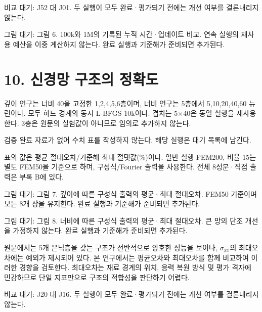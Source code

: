 \documentclass[10pt,a4paper]{article}
\begin{document}
{\small\color{muted} 비교 대기: J52 대 J01. 두 실행이 모두 완료·평가되기 전에는 개선 여부를 결론내리지 않는다.\par}

{\small\color{muted} 그림 대기: 그림 6. 100k와 1M의 기록된 누적 시간·업데이트 비교. 연속 실행의 재사용 예산을 이중 계산하지 않는다. 완료 실행과 기준해가 준비되면 추가된다.\par}

\clearpage

\section{10. 신경망 구조의 정확도}

깊이 연구는 너비 40을 고정한 1,2,4,5,6층이며, 너비 연구는 5층에서 5,10,20,40,60 뉴런이다. 모두 하드 경계의 동시 L-BFGS 10k이다. 겹치는 5$\times$40은 동일 실행을 재사용한다. 3층은 원문의 실험값이 아니므로 임의로 추가하지 않는다.\par

{\small\color{muted} 검증 완료 자료가 없어 수치 표를 작성하지 않는다. 해당 실행은 대기 목록에 남긴다.\par}

{\small\color{muted} 표의 값은 평균 절대오차/기준해 최대 절댓값(\%)이다. 일반 실행 FEM200, 비율 15는 별도 FEM50을 기준으로 하며, 구성식/Fourier 출력을 사용한다. 전체 8성분·직접 출력은 부록 B에 있다.\par}

{\small\color{muted} 그림 대기: 그림 7. 깊이에 따른 구성식 출력의 평균·최대 절대오차. FEM50 기준이며 모든 8개 장을 유지한다. 완료 실행과 기준해가 준비되면 추가된다.\par}

{\small\color{muted} 그림 대기: 그림 8. 너비에 따른 구성식 출력의 평균·최대 절대오차. 큰 망의 단조 개선을 가정하지 않는다. 완료 실행과 기준해가 준비되면 추가된다.\par}

원문에서는 5개 은닉층을 갖는 구조가 전반적으로 양호한 성능을 보이나, $\sigma_{xx}$의 최대오차에는 예외가 제시되어 있다. 본 연구에서는 평균오차와 최대오차를 함께 비교하여 이러한 경향을 검토한다. 최대오차는 재료 경계의 위치, 응력 복원 방식 및 평가 격자에 민감하므로 단일 지표만으로 구조의 적합성을 판단하기 어렵다.\par

{\small\color{muted} 비교 대기: J20 대 J16. 두 실행이 모두 완료·평가되기 전에는 개선 여부를 결론내리지 않는다.\par}
\end{document}
